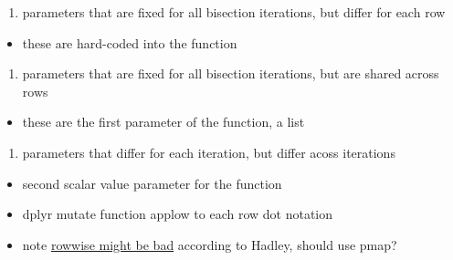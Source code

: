 \documentclass[
]{book}
\providecommand{\tightlist}{%
  \setlength{\itemsep}{0pt}\setlength{\parskip}{0pt}}
\begin{document}
\begin{enumerate}
\def\labelenumi{\arabic{enumi}.}
\tightlist
\item
  parameters that are fixed for all bisection iterations, but differ for each row
\end{enumerate}

\begin{itemize}
\tightlist
\item
  these are hard-coded into the function
\end{itemize}

\begin{enumerate}
\def\labelenumi{\arabic{enumi}.}
\setcounter{enumi}{1}
\tightlist
\item
  parameters that are fixed for all bisection iterations, but are shared across rows
\end{enumerate}

\begin{itemize}
\tightlist
\item
  these are the first parameter of the function, a list
\end{itemize}

\begin{enumerate}
\def\labelenumi{\arabic{enumi}.}
\setcounter{enumi}{2}
\tightlist
\item
  parameters that differ for each iteration, but differ acoss iterations
\end{enumerate}

\begin{itemize}
\item
  second scalar value parameter for the function
\item
  dplyr mutate function applow to each row dot notation
\item
  note \href{https://community.rstudio.com/t/dplyr-alternatives-to-rowwise/8071}{rowwise might be bad} according to Hadley, should use pmap?
\end{itemize}
\end{document}
